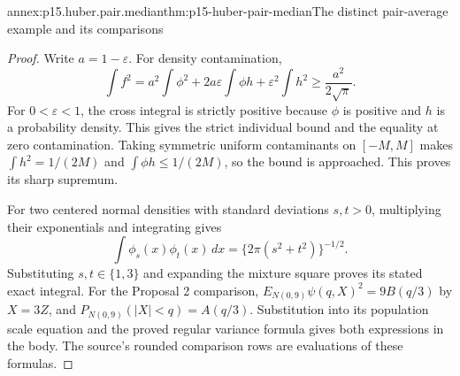 \begin{annexitem}{annex:p15.huber.pair.median}{thm:p15-huber-pair-median}{The distinct pair-average example and its comparisons}
\begin{proof}
Write \(a=1-\varepsilon\). For density contamination,
\[
 \int f^2=a^2\int\phi^2+2a\varepsilon\int\phi h
                      +\varepsilon^2\int h^2
       \geq\frac{a^2}{2\sqrt\pi}.
\]
For \(0<\varepsilon<1\), the cross integral is strictly positive
because \(\phi\) is positive and \(h\) is a probability density.
This gives the strict individual bound and the equality at zero
contamination. Taking symmetric uniform contaminants on
\([-M,M]\) makes \(\int h^2=1/(2M)\) and
\(\int\phi h\leq1/(2M)\), so the bound is approached.
This proves its sharp supremum.

For two centered normal densities with standard deviations
\(s,t>0\), multiplying their exponentials and integrating gives
\[
 \int\phi_s(x)\phi_t(x)\,dx
            =\{2\pi(s^2+t^2)\}^{-1/2}.
\]
Substituting \(s,t\in\{1,3\}\) and expanding the mixture square
proves its stated exact integral.
For the Proposal 2 comparison,
\(E_{N(0,9)}\psi(q,X)^2=9B(q/3)\) by \(X=3Z\), and
\(P_{N(0,9)}(|X|<q)=A(q/3)\).
Substitution into its population scale equation and the proved
regular variance formula gives both expressions in the body.
The source's rounded comparison rows are evaluations of these
formulas.
\end{proof}
\end{annexitem}
